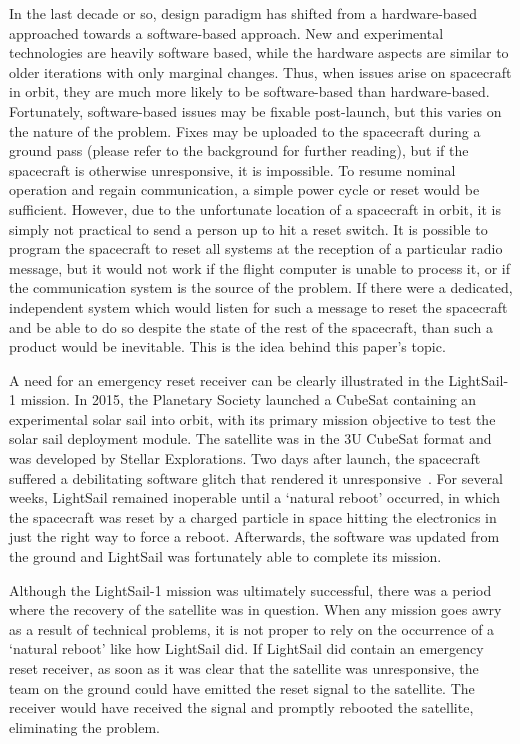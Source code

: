 \documentclass[12pt, twoside]{report}
\begin{document}
\par In the last decade or so, design paradigm has shifted from a hardware-based approached towards a software-based approach.
New and experimental technologies are heavily software based, while the hardware aspects are similar to older iterations with only marginal changes.
Thus, when issues arise on spacecraft in orbit, they are much more likely to be software-based than hardware-based.
Fortunately, software-based issues may be fixable post-launch, but this varies on the nature of the problem.
Fixes may be uploaded to the spacecraft during a ground pass (please refer to the background for further reading), but if the spacecraft is otherwise unresponsive, it is impossible.
To resume nominal operation and regain communication, a simple power cycle or reset would be sufficient.
However, due to the unfortunate location of a spacecraft in orbit, it is simply not practical to send a person up to hit a reset switch.
It is possible to program the spacecraft to reset all systems at the reception of a particular radio message, but it would not work if the flight computer is unable to process it, or if the communication system is the source of the problem.
If there were a dedicated, independent system which would listen for such a message to reset the spacecraft and be able to do so despite the state of the rest of the spacecraft, than such a product would be inevitable.
This is the idea behind this paper's topic.

\par A need for an emergency reset receiver can be clearly illustrated in the LightSail-1 mission.
In 2015, the Planetary Society launched a CubeSat containing an experimental solar sail into orbit, with its primary mission objective to test the solar sail deployment module.
The satellite was in the 3U CubeSat format and was developed by Stellar Explorations.
Two days after launch, the spacecraft suffered a debilitating software glitch that rendered it unresponsive~\cite{lightsailglitch}.
For several weeks, LightSail remained inoperable until a `natural reboot' occurred, in which the spacecraft was reset by a charged particle in space hitting the electronics in just the right way to force a reboot.
Afterwards, the software was updated from the ground and LightSail was fortunately able to complete its mission.

\par Although the LightSail-1 mission was ultimately successful, there was a period where the recovery of the satellite was in question. When any mission goes awry as a result of technical problems, it is not proper to rely on the occurrence of a `natural reboot' like how LightSail did. If LightSail did contain an emergency reset receiver, as soon as it was clear that the satellite was unresponsive, the team on the ground could have emitted the reset signal to the satellite. The receiver would have received the signal and promptly rebooted the satellite, eliminating the problem.
\end{document}
